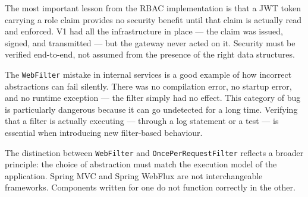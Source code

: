 The most important lesson from the RBAC implementation is that a JWT token carrying a role claim provides no security benefit until that claim is actually read and enforced. V1 had all the infrastructure in place --- the claim was issued, signed, and transmitted --- but the gateway never acted on it. Security must be verified end-to-end, not assumed from the presence of the right data structures.

The \texttt{WebFilter} mistake in internal services is a good example of how incorrect abstractions can fail silently. There was no compilation error, no startup error, and no runtime exception --- the filter simply had no effect. This category of bug is particularly dangerous because it can go undetected for a long time. Verifying that a filter is actually executing --- through a log statement or a test --- is essential when introducing new filter-based behaviour.

The distinction between \texttt{WebFilter} and \texttt{OncePerRequestFilter} reflects a broader principle: the choice of abstraction must match the execution model of the application. Spring MVC and Spring WebFlux are not interchangeable frameworks. Components written for one do not function correctly in the other.